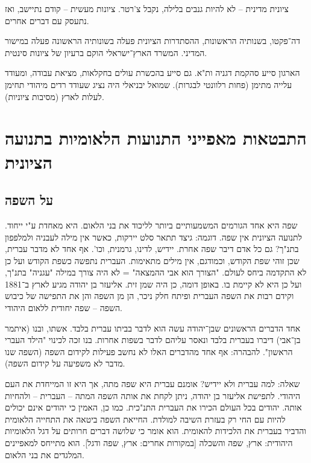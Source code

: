 \documentclass[a4paper]{book}
\begin{document}
	ציונית מדינית – לא להיות גנבים בלילה, נקבל צ'רטר. ציונות מעשית – קודם נתיישב, ואז נתעסק עם דברים אחרים. 
	
	דה־פקטו, בשנותיה הראשונות, ההסתדרות הציונית פעלה בשונותיה הראשונה פעלה במישור המדיני. המשרד הארץ־ישראלי הוקם ברעיון של ציונות סינטית. 
	
	הארגון סייע סהקמת דגניה ות"א. גם סייע בהכשרת עולים בחקלאות, מציאת עבודה, ומעודד עלייה מתימן (פחות רלוונטי לבגרות). שמואל יבניאלי היה נציג שעודד רדים מיהודי תחימן לעלות לארץ (מסיבות ציוניות). 
	
	\section{התבטאות מאפייני התנועות הלאומיות בתנועה הציונית}
	\subsection{על השפה}
	שפה היא אחד הגורמים המשמעותיים ביותר לליכוד את בני הלאום. היא מאחדת ע"י ייחוד. לתנועה הציונית אין שפה. דוגמה: גיצד תתאר סלט יירקות, כאשר אין מילה לעבניה ולמלפפון בתנ"ך? גם כל אדם דיבר שפה אחרת. יידיש, לדינו, גרמנית, וכו'. אף אחד לא מדבר עברית, שכן זוהי שפת הקודש, וכמודגם, אין מילים מתאימות. העברית נתפשה כשפת הקודש ועל כן לא התקדמה ביחס לעולם. "הצורך הוא אבי ההמצאה" = לא היה צורך במילה "עגניה" בתנ"ך, ועל כן היא לא קיימת בו. באופן דומה, כן היה שמן זית. אליעזר בן יהודה מגיע לארץ ב־1881 וקידם רבות את השפה העברית ופיתח חלק ניכר, הן מן השפה והן את התפישה של כיבוש השפה – שפה יחודית ללאום היהודי. 
	
	אחד הדברים הראשונים שבן־יהודה עשה הוא לדבר בביתו עברית בלבד. אשתו, ובנו (איתמר בן־אבי) דיברו בעברית בלבד ונאסר עליהם לדבר בשפות אחרות. בנו זכה לכינוי "הילד העברי הראשון". להבהרה: אף אחד מהדברים האלו לא נחשב פעילות לקידום השפה (השפה שנו מדבר לא משפיעה על קידום השפה). 
	
	שאלה: למה עברית ולא יידיש? אומנם עברית היא שפה מתה, אך היא זו המייחדת את העם היהודי. לתפישת אליעזר בן יהודה, ניתן לקחת את אותה השפה המתה – העברית – ולהחיות אותה. יהודים בכל העולם הכירו את העברית התנ"כית. כמו כן, האמין כי יהודים  אינם יכולים להיות עם החי רק בעזרת השיבה למולדת. החייאת השפה ביטאה את התחייה הלאומית והדביר בעברית את הלכידות להאומית. הוא אומר כי שלושה דברים חרותים על דגל הלאומיות היהודית: ארץ, שפה והשכלה [במקורות אחרים: ארץ, שפה ודגל]. הוא מתייחס למאפיינים המלגדים את בני הלאום. 
	
\end{document}
